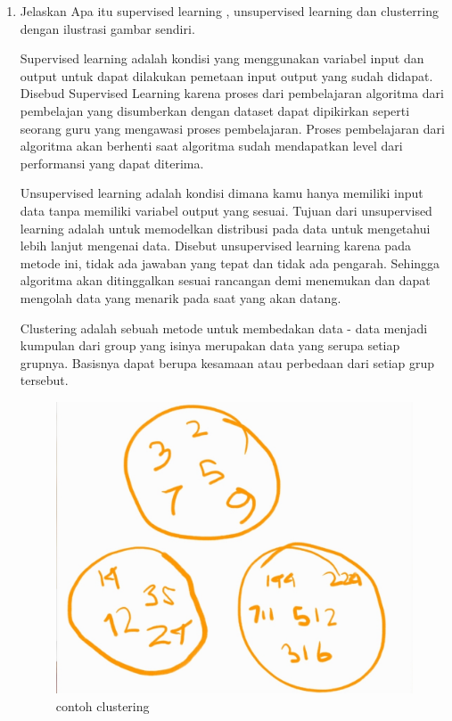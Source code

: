 \begin{enumerate}
\item Jelaskan Apa itu supervised learning , unsupervised learning dan clusterring dengan ilustrasi gambar sendiri.\par
Supervised learning adalah kondisi yang menggunakan variabel input dan output untuk dapat dilakukan pemetaan input output yang sudah didapat. Disebud Supervised Learning karena proses dari pembelajaran algoritma dari pembelajan yang disumberkan dengan dataset dapat dipikirkan seperti seorang guru yang mengawasi proses pembelajaran. Proses pembelajaran dari algoritma akan berhenti saat algoritma sudah mendapatkan level dari performansi yang dapat diterima. \par
Unsupervised learning adalah kondisi dimana kamu hanya memiliki input data tanpa memiliki variabel output yang sesuai. Tujuan dari unsupervised learning adalah untuk memodelkan distribusi pada data untuk mengetahui lebih lanjut mengenai data. Disebut unsupervised learning karena pada metode ini, tidak ada jawaban yang tepat dan tidak ada pengarah. Sehingga algoritma akan ditinggalkan sesuai rancangan demi menemukan dan dapat mengolah data yang menarik pada saat yang akan datang. \par
Clustering adalah sebuah metode untuk membedakan data - data menjadi kumpulan dari group yang isinya merupakan data yang serupa setiap grupnya. Basisnya dapat berupa kesamaan atau perbedaan dari setiap grup tersebut. \par
\begin{figure}[H]
\centering
\includegraphics[scale=0.2]{figures/1174035/chapter2/clustering.jpeg}
\caption{contoh clustering}
\label{contoh2}
\end{figure}



\end{enumerate}
